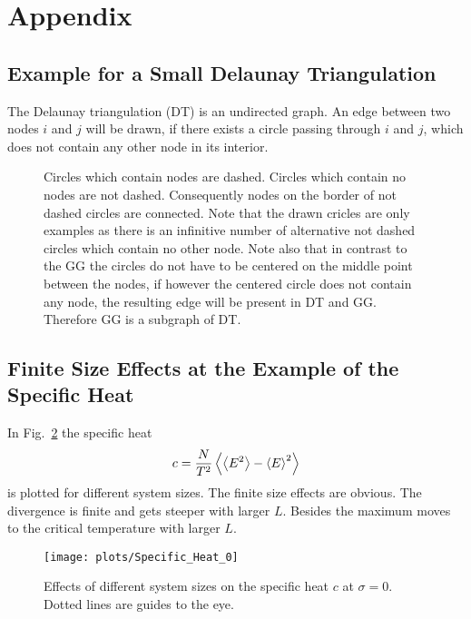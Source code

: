 \section{Appendix}
\subsection{Example for a Small Delaunay Triangulation}
\label{appendix:DT_def}
    The Delaunay triangulation (DT) is an undirected graph. An edge
    between two nodes \(i\) and \(j\) will be drawn, if there exists
    a circle passing through \(i\) and \(j\), which does not contain
    any other node in its interior.
    \begin{figure}[htbp]
    \centering
        
        \label{fig:def:DT}
        \caption[Example for a Small Delaunay Triangulation]
        {
            Circles which contain nodes are dashed.
            Circles which contain no nodes are not dashed.
            Consequently nodes on the border of not dashed circles are
            connected. Note that the drawn cricles are only examples
            as there is an infinitive number of alternative not
            dashed circles which contain no other node.
            Note also that in contrast to the GG the circles do not
            have to be centered on the middle point between the nodes, if
            however the centered circle does not contain any node, the
            resulting edge will be present in DT and GG. Therefore GG is
            a subgraph of DT.
        }
    \end{figure}

\subsection{Finite Size Effects at the Example of the Specific Heat}
\label{appendix:finiteSizeEffects}
    In Fig.\ \ref{fig:smeared_out_appendix} the specific heat
    \begin{equation}
        c = \frac{N}{T^2}\left< \left< E^2 \right> - \left< E \right>^2 \right>
    \end{equation}
    is plotted for different system sizes. The finite size effects are obvious.
    The divergence is finite and gets steeper with larger \(L\). Besides
    the maximum moves to the critical temperature with larger \(L\).
    \begin{figure}[htbp]
        \centering
        \texttt{[image: plots/Specific\_Heat\_0]}
        \caption[Finite Size Effects by Example of the Specific Heat]
        {
            Effects of different system sizes on the specific heat \(c\)
            at \(\sigma = 0\). Dotted lines are guides to the eye.
        }
        \label{fig:smeared_out_appendix}
    \end{figure}
